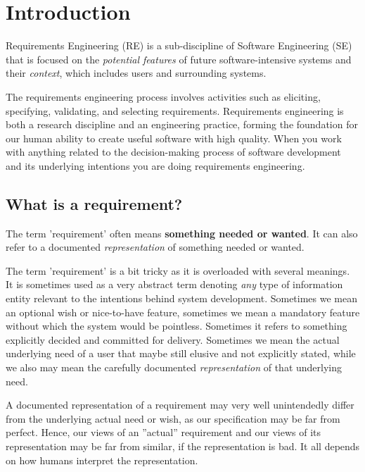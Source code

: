 \chapter{Introduction}%
%
Requirements Engineering (RE) is a sub-discipline of Software Engineering (SE) that is focused on the \textit{potential features} of future software-intensive systems and their \textit{context}, which includes users and surrounding systems.

The requirements engineering process involves activities such as eliciting, specifying, validating, and selecting requirements. 
Requirements engineering is both a research discipline and an engineering practice, forming the foundation for our human ability to create useful software with high quality. When you work with anything related to the decision-making process of software development and its underlying intentions you are doing requirements engineering.

\section{What is a requirement?}%

The term 'requirement' often means \textbf{something needed or wanted}. It can also refer to a documented \emph{representation} of something needed or wanted. 

The term 'requirement' is a bit tricky as it is overloaded with several meanings. It is sometimes used as a very abstract term denoting \textit{any} type of information entity relevant to the intentions behind system development.  Sometimes we mean an optional wish or nice-to-have feature, sometimes we mean a mandatory feature without which the system would be pointless. Sometimes it refers to something explicitly decided and committed for delivery. Sometimes we mean the actual underlying need of a user that maybe still elusive and not explicitly stated, while we also may mean the carefully documented \textit{representation} of that underlying need. 

A documented representation of a requirement may very well unintendedly differ from the underlying actual need or wish, as our specification may be far from perfect. Hence, our views of an ''actual'' requirement and our views of its representation may be far from similar, if the representation is bad. It all depends on how humans interpret the representation.

